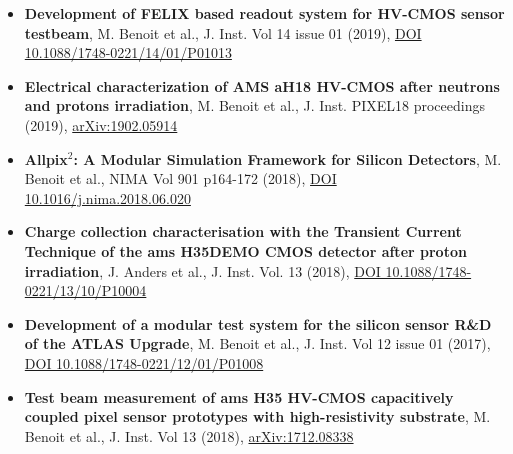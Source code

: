 \pagebreak
{}


\begin{itemize}
  \setlength\itemsep{-1.8em}

\item \textbf{Development of FELIX based readout system for HV-CMOS sensor testbeam}, M. Benoit et al., J. Inst. Vol 14 issue 01 (2019), \href{https://iopscience.iop.org/article/10.1088/1748-0221/14/01/P01013}{DOI 10.1088/1748-0221/14/01/P01013}\\

\item \textbf{Electrical characterization of AMS aH18 HV-CMOS after neutrons and protons irradiation}, M. Benoit et al., J. Inst. PIXEL18 proceedings (2019), \href{https://arxiv.org/abs/1902.05914}{arXiv:1902.05914} \\

\item \textbf{Allpix$^2$: A Modular Simulation Framework for Silicon Detectors}, M. Benoit et al., NIMA Vol 901 p164-172 (2018), \href{https://doi.org/10.1016/j.nima.2018.06.020}{DOI 10.1016/j.nima.2018.06.020}\\

\item \textbf{Charge collection characterisation with the Transient Current Technique of the ams H35DEMO CMOS detector after proton irradiation}, J. Anders et al., J. Inst. Vol. 13 (2018), \href{https://iopscience.iop.org/article/10.1088/1748-0221/13/10/P10004}{DOI 10.1088/1748-0221/13/10/P10004}\\

\item \textbf{Development of a modular test system for the silicon sensor R\&D of the ATLAS Upgrade}, M. Benoit et al., J. Inst. Vol 12 issue 01 (2017), \href{https://iopscience.iop.org/article/10.1088/1748-0221/12/01/P01008}{DOI 10.1088/1748-0221/12/01/P01008}\\

\item \textbf{Test beam measurement of ams H35 HV-CMOS capacitively coupled pixel sensor prototypes with high-resistivity substrate}, M. Benoit et al., J. Inst. Vol 13 (2018), \href{https://arxiv.org/abs/1712.08338}{arXiv:1712.08338} \\


\end{itemize}
